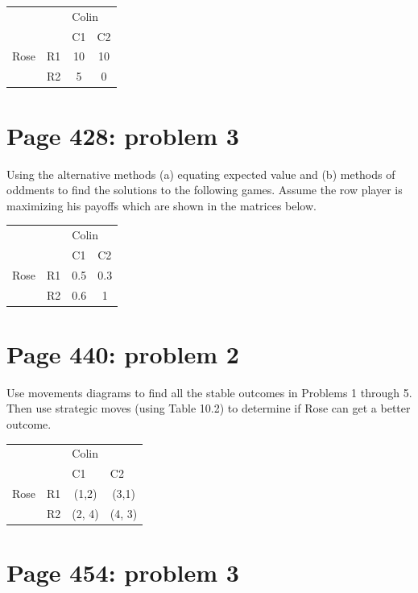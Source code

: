 \documentclass[]{article}
\begin{document}
\begin{table}[!h]
\centering
\begin{tabular}{lllc}
 &  & \multicolumn{2}{l}{Colin} \\ \cline{3-4}
 &  & C1 & \multicolumn{1}{l}{C2} \\ \hline
Rose & R1 & \multicolumn{1}{c}{10} & 10 \\
 & R2 & \multicolumn{1}{c}{5} & 0 \\ \hline
\end{tabular}
\end{table}

\section{Page 428: problem 3}\label{page-428-problem-3}

Using the alternative methods (a) equating expected value and (b)
methods of oddments to find the solutions to the following games. Assume
the row player is maximizing his payoffs which are shown in the matrices
below.

\begin{table}[!h]
\centering
\begin{tabular}{lllc}
 &  & \multicolumn{2}{l}{Colin} \\ \cline{3-4}
 &  & C1 & \multicolumn{1}{l}{C2} \\ \hline
Rose & R1 & \multicolumn{1}{c}{0.5} & 0.3 \\
 & R2 & \multicolumn{1}{c}{0.6} & 1 \\ \hline
\end{tabular}
\end{table}

\section{Page 440: problem 2}\label{page-440-problem-2}

Use movements diagrams to find all the stable outcomes in Problems 1
through 5. Then use strategic moves (using Table 10.2) to determine if
Rose can get a better outcome.

\begin{table}[!h]
\centering
\begin{tabular}{lllc}
 &  & \multicolumn{2}{l}{Colin} \\ \cline{3-4}
 &  & C1 & \multicolumn{1}{l}{C2} \\ \hline
Rose & R1 & \multicolumn{1}{c}{(1,2)} & (3,1) \\
 & R2 & \multicolumn{1}{c}{(2, 4)} & (4, 3)\\ \hline
\end{tabular}
\end{table}

\section{Page 454: problem 3}\label{page-454-problem-3}
\end{document}

